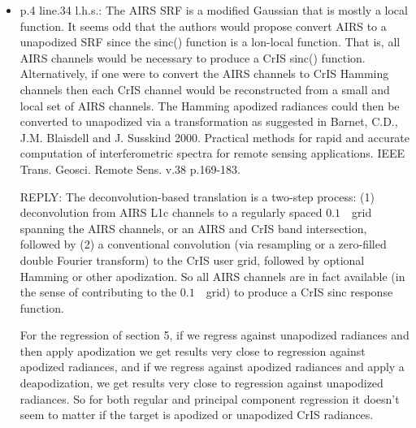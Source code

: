 \documentclass[11pt]{article}
\newcommand {\reply} {\mbox{\small REPLY}}
\begin{document}
\begin{itemize}
  \reply: We agree there is no loss in interferometric resolution
  with an invertible apodization.  Hamming apodization does reduce
  resolving power $R = v_i/ \fwhm_i$, since it increases $\fwhm$
  while decreasing the side-lobes.  We changed ``resolution'' to
  ``resolving power'' and set Barnet et al. 2000 as noted below as
  our first citation for apodization, for the sentence in question.


  
\item p.4 line.34 l.h.s.: The AIRS SRF is a modified Gaussian that
  is mostly a local function. It seems odd that the authors would
  propose convert AIRS to a unapodized SRF since the sinc() function
  is a lon-local function. That is, all AIRS channels would be
  necessary to produce a CrIS sinc() function. Alternatively, if one
  were to convert the AIRS channels to CrIS Hamming channels then
  each CrIS channel would be reconstructed from a small and local
  set of AIRS channels. The Hamming apodized radiances could then be
  converted to unapodized via a transformation as suggested in
  Barnet, C.D., J.M. Blaisdell and J.  Susskind 2000. Practical
  methods for rapid and accurate computation of interferometric
  spectra for remote sensing applications. IEEE
  Trans. Geosci. Remote Sens. v.38 p.169-183.

  \reply: The deconvolution-based translation is a two-step process:
  (1) deconvolution from AIRS L1c channels to a regularly spaced
  $0.1$~\wn\ grid spanning the AIRS channels, or an AIRS and CrIS
  band intersection, followed by (2) a conventional convolution 
  (via resampling or a zero-filled double Fourier transform) to the
  CrIS user grid, followed by optional Hamming or other apodization.
  So all AIRS channels are in fact available (in the sense of
  contributing to the $0.1$~\wn\ grid) to produce a CrIS sinc
  response function.

  For the regression of section 5, if we regress against unapodized
  radiances and then apply apodization we get results very close to
  regression against apodized radiances, and if we regress against
  apodized radiances and apply a deapodization, we get results very
  close to regression against unapodized radiances.  So for both
  regular and principal component regression it doesn't seem to
  matter if the target is apodized or unapodized CrIS radiances.


\end{itemize}
\end{document}
